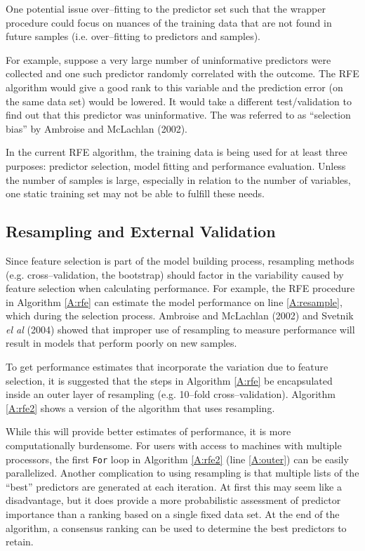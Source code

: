 \documentclass[12pt]{article}
\begin{document}
One potential issue over--fitting to the predictor set such that the wrapper procedure could focus on nuances of the training data that are not found in future samples (i.e. over--fitting to predictors and samples). 

For example, suppose a very large number of uninformative predictors were collected and one such predictor randomly correlated with the outcome. The RFE algorithm would give a good rank to this variable and the prediction error (on the same data set) would be lowered. It would take a different test/validation to find out that this predictor was uninformative. The was referred to as ``selection bias'' by Ambroise and McLachlan (2002).

In the current RFE algorithm, the training data is being used for at least three purposes: predictor selection, model fitting and performance evaluation. Unless the number of samples is large, especially in relation to the number of variables, one static training set may not be able to fulfill these needs.

\subsection{Resampling and External Validation}

Since feature selection is part of the model building process, resampling methods (e.g. cross--validation, the bootstrap) should factor in the variability caused by feature selection when calculating performance. For example, the RFE procedure in Algorithm \ref{A:rfe} can estimate the model performance on line \ref{A:resample}, which during the selection process.  Ambroise and McLachlan (2002) and Svetnik {\it el al} (2004) showed that improper use of resampling to measure performance will result in models that perform poorly on new samples.

To get performance estimates that incorporate the variation due to feature selection, it is suggested that the steps in Algorithm \ref{A:rfe} be encapsulated inside an outer layer of resampling (e.g. 10--fold cross--validation). Algorithm \ref{A:rfe2} shows a version of the algorithm that uses resampling.

While this will provide better estimates of performance, it is more computationally burdensome. For users with access to machines with multiple processors, the first \texttt{For} loop in Algorithm \ref{A:rfe2} (line \ref{A:outer}) can be easily parallelized. Another complication to using resampling is that multiple lists of the ``best'' predictors are generated at each iteration. At first this may seem like a disadvantage, but it does provide a more probabilistic assessment of predictor importance than a ranking based on a single fixed data set. At the end of the algorithm, a consensus ranking can be used to determine the best predictors to retain.
\end{document}
